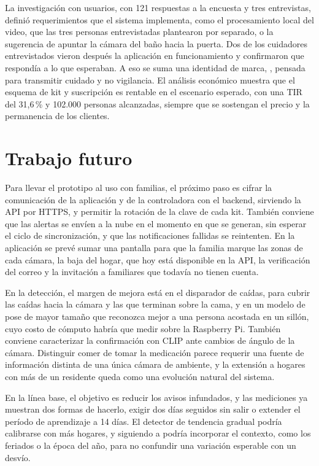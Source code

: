 La investigación con usuarios, con 121 respuestas a la encuesta y tres entrevistas, definió requerimientos que el sistema implementa, como el procesamiento local del video, que las tres personas entrevistadas plantearon por separado, o la sugerencia de apuntar la cámara del baño hacia la puerta.
Dos de los cuidadores entrevistados vieron después la aplicación en funcionamiento y confirmaron que respondía a lo que esperaban.
A eso se suma una identidad de marca, \marca, pensada para transmitir cuidado y no vigilancia.
El análisis económico muestra que el esquema de kit y suscripción es rentable en el escenario esperado, con una TIR del 31,6\,\% y 102.000 personas alcanzadas, siempre que se sostengan el precio y la permanencia de los clientes.

\section{Trabajo futuro}

Para llevar el prototipo al uso con familias, el próximo paso es cifrar la comunicación de la aplicación y de la controladora con el backend, sirviendo la API por HTTPS, y permitir la rotación de la clave de cada kit.
También conviene que las alertas se envíen a la nube en el momento en que se generan, sin esperar el ciclo de sincronización, y que las notificaciones fallidas se reintenten.
En la aplicación se prevé sumar una pantalla para que la familia marque las zonas de cada cámara, la baja del hogar, que hoy está disponible en la API, la verificación del correo y la invitación a familiares que todavía no tienen cuenta.

En la detección, el margen de mejora está en el disparador de caídas, para cubrir las caídas hacia la cámara y las que terminan sobre la cama, y en un modelo de pose de mayor tamaño que reconozca mejor a una persona acostada en un sillón, cuyo costo de cómputo habría que medir sobre la Raspberry Pi.
También conviene caracterizar la confirmación con CLIP ante cambios de ángulo de la cámara.
Distinguir comer de tomar la medicación parece requerir una fuente de información distinta de una única cámara de ambiente, y la extensión a hogares con más de un residente queda como una evolución natural del sistema.

En la línea base, el objetivo es reducir los avisos infundados, y las mediciones ya muestran dos formas de hacerlo, exigir dos días seguidos sin salir o extender el período de aprendizaje a 14 días.
El detector de tendencia gradual podría calibrarse con más hogares, y siguiendo a \textcite{Snoun2024} podría incorporar el contexto, como los feriados o la época del año, para no confundir una variación esperable con un desvío.

